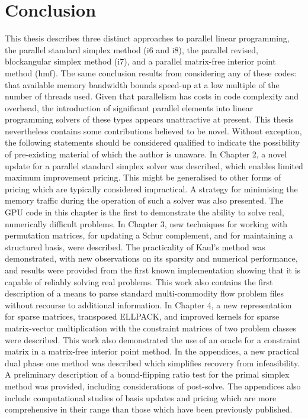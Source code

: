 \chapter{Conclusion} \label{chap:8}
	
This thesis describes three distinct approaches to parallel linear programming,
the parallel standard simplex method (i6 and i8), the parallel revised, blockangular
simplex method (i7), and a parallel matrix-free interior point method
(hmf). The same conclusion results from considering any of these codes: that
available memory bandwidth bounds speed-up at a low multiple of the number of
threads used. Given that parallelism has costs in code complexity and overhead,
the introduction of significant parallel elements into linear programming solvers
of these types appears unattractive at present.
This thesis nevertheless contains some contributions believed to be novel.
Without exception, the following statements should be considered qualified to
indicate the possibility of pre-existing material of which the author is unaware.
In Chapter 2, a novel update for a parallel standard simplex solver was described,
which enables limited maximum improvement pricing. This might be
generalised to other forms of pricing which are typically considered impractical.
A strategy for minimising the memory traffic during the operation of such a
solver was also presented. The GPU code in this chapter is the first to demonstrate
the ability to solve real, numerically difficult problems.
In Chapter 3, new techniques for working with permutation matrices, for
updating a Schur complement, and for maintaining a structured basis, were
described. The practicality of Kaul’s method was demonstrated, with new observations
on its sparsity and numerical performance, and results were provided
from the first known implementation showing that it is capable of reliably solving
real problems. This work also contains the first description of a means to
parse standard multi-commodity flow problem files without recourse to additional
information.
In Chapter 4, a new representation for sparse matrices, transposed ELLPACK,
and improved kernels for sparse matrix-vector multiplication with the
constraint matrices of two problem classes were described. This work also
demonstrated the use of an oracle for a constraint matrix in a matrix-free interior
point method.
In the appendices, a new practical dual phase one method was described
which simplifies recovery from infeasibility. A preliminary description of a
bound-flipping ratio test for the primal simplex method was provided, including
considerations of post-solve. The appendices also include computational studies
of basis updates and pricing which are more comprehensive in their range than
those which have been previously published.

